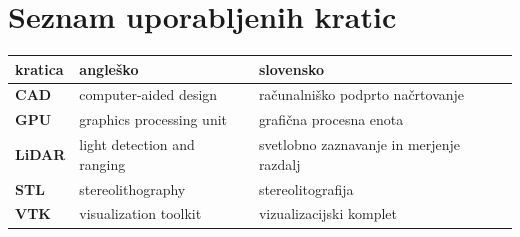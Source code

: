 \chapter*{Seznam uporabljenih kratic}

\begin{tabular}{l|l|l}
  {\bf kratica} & {\bf angleško} & {\bf slovensko} \\ \hline
  {\bf CAD} & computer-aided design & računalniško podprto načrtovanje \\
  {\bf GPU} & graphics processing unit & grafična procesna enota \\
  {\bf LiDAR} & light detection and ranging & svetlobno zaznavanje in merjenje razdalj \\
  {\bf STL} & stereolithography & stereolitografija \\
  {\bf VTK} & visualization toolkit & vizualizacijski komplet \\
\end{tabular}
